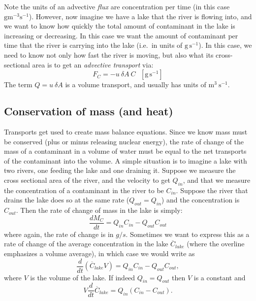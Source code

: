 Note the units of an advective \emph{flux} are concentration per time (in this case $\mathrm{g m^{-3} s^{-1}}$).  However, now imagine we have a lake that the river is flowing into, and we want to know how quickly the total amount of contaminant in the lake is increasing or decreasing.  In this case we want the amount of contaminant per time that the river is carrying into the lake (i.e.\ in units of $\mathrm{g\, s^{-1}}$). In this case, we need to know not only how fast the river is moving, but also what its cross-sectional area is to get an \emph{advective transport} via:
\begin{equation}
    F_C = -u\ \delta A\ C \ \ \ \mathrm{[g\,s^{-1}]}
\end{equation} 
The term $Q = u\ \delta A$ is a volume transport, and usually has units of $\mathrm{ m^3\ s^{-1}}$.  

\subsection{Conservation of mass (and heat)}

Transports get used to create mass balance equations.  Since we know mass must be conserved (plus or minus releasing nuclear energy), the rate of change of the mass of a contaminant in a volume of water must be equal to the net transports of the contaminant into the volume.  A simple situation is to imagine a lake with two rivers, one feeding the lake and one draining it.  Suppose we measure the cross sectional area of the river, and the velocity to get $Q_{in}$, and that we measure the concentration of a contaminant in the river to be $C_{in}$.  Suppose the river that drains the lake does so at the same rate ($Q_{out} = Q_{in}$) and the concentration is $C_{out}$.  Then the rate of change of mass in the lake is simply:
\begin{equation}
    \frac{d M_C}{dt} = Q_{in} C_{in} - Q_{out}C_{out}
\end{equation}
where again, the rate of change is in $g/s$.  Sometimes we want to express this as a rate of change of the average concentration in the lake $\overline{C}_{lake}$ (where the overline emphasizes a volume average), in which case we would write as 
\begin{equation}
    \frac{d}{dt}\left(\overline{C}_{lake} V\right) = Q_{in} C_{in} - Q_{out}C_{out},
\end{equation}
where $V$ is the volume of the lake. If indeed $Q_{in} = Q_{out}$ then $V$ is a constant and 
\begin{equation}
    V\frac{d}{dt} \overline{C}_{lake}= Q_{in} \left(C_{in} - C_{out}\right).  
\end{equation}

